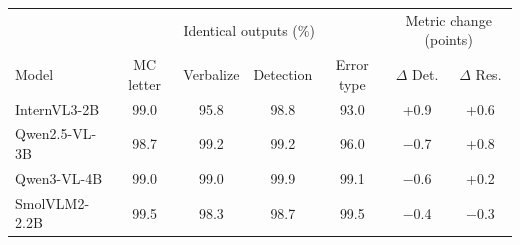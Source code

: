 \begin{tabular}{lcccccc}
\toprule
 & \multicolumn{4}{c}{Identical outputs (\%)} & \multicolumn{2}{c}{Metric change (points)} \\
Model & MC letter & Verbalize & Detection & Error type & $\Delta$ Det. & $\Delta$ Res. \\
\midrule
InternVL3-2B & 99.0 & 95.8 & 98.8 & 93.0 & +0.9 & +0.6 \\
Qwen2.5-VL-3B & 98.7 & 99.2 & 99.2 & 96.0 & $-$0.7 & +0.8 \\
Qwen3-VL-4B & 99.0 & 99.0 & 99.9 & 99.1 & $-$0.6 & +0.2 \\
SmolVLM2-2.2B & 99.5 & 98.3 & 98.7 & 99.5 & $-$0.4 & $-$0.3 \\
\bottomrule
\end{tabular}
